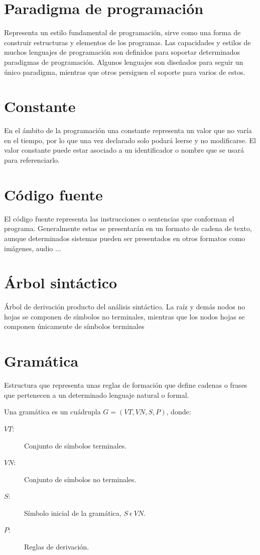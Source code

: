 \section {Paradigma de programación}
Representa un estilo fundamental de programación, sirve como una forma de construir estructuras y elementos de los programas. Las capacidades y estilos de muchos 
lenguajes de programación son definidos para soportar determinados paradigmas de programación. Algunos lenguajes son diseñados para seguir un único paradigma, mientras
que otros persiguen el soporte para varios de estos. 

\section {Constante}
En el ámbito de la programación una constante representa un valor que no varía en el tiempo, por lo que una vez declarado solo podará leerse y no modificarse. El valor constante 
puede estar asociado a un identificador o nombre que se usará para referenciarlo. 

\section {Código fuente}
El código fuente representa las instrucciones o sentencias que conforman el programa. Generalmente estas se presentarán en un formato de cadena de texto, aunque determinados sistemas
pueden ser presentados en otros formatos como imágenes, audio ...

\section {Árbol sintáctico}
Árbol de derivación producto del análisis sintáctico. La raíz y demás nodos no hojas se componen de símbolos no terminales, mientras que los nodos hojas se componen únicamente de símbolos
terminales

\section {Gramática}
Estructura que representa unas reglas de formación que define cadenas o frases que pertenecen a un determinado lenguaje natural o formal. 

Una gramática es un cuádrupla $ G = (VT, VN, S, P) $, donde: 

\begin {description}
\item[$VT$:] Conjunto de símbolos terminales.
\item[$VN$:] Conjunto de símbolos no terminales.
\item[$S$:] Símbolo inicial de la gramática, $S\ \epsilon\ VN$.
\item[$P$:] Reglas de derivación.
\end{description}

